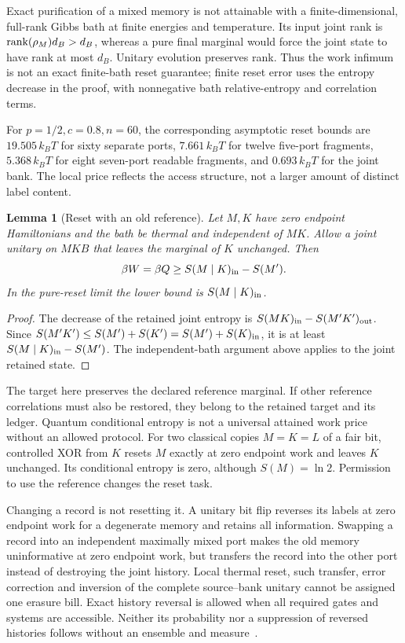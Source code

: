 \documentclass[12pt,a4paper]{article}
\newtheorem{lemma}[theorem]{Lemma}
\begin{document}
Exact purification of a mixed memory is not attainable with a
finite-dimensional, full-rank Gibbs bath at finite energies and temperature.
Its input joint rank is \({\rm rank}(\rho_M)d_B>d_B\), whereas a pure
final marginal would force the joint state to have rank at most \(d_B\).
Unitary evolution preserves rank. Thus the work infimum is not an exact
finite-bath reset guarantee; finite reset error uses the entropy decrease
in the proof, with nonnegative bath relative-entropy and correlation terms.

For \(p=1/2,c=0.8,n=60\), the corresponding asymptotic reset bounds
are \(19.505\,k_BT\) for sixty separate ports, \(7.661\,k_BT\)
for twelve five-port fragments, \(5.368\,k_BT\) for eight seven-port
readable fragments, and \(0.693\,k_BT\) for the joint bank.
The local price reflects the access structure, not a larger amount
of distinct label content.

\begin{lemma}[Reset with an old reference]\label{lem:conditional-reset}
Let \(M,K\) have zero endpoint Hamiltonians and the bath be thermal
and independent of \(MK\). Allow a joint unitary on \(MKB\) that leaves
the marginal of \(K\) unchanged. Then
\[
 \beta W=\beta Q\ge S(M\mid K)_{\rm in}-S(M') .
\]
In the pure-reset limit the lower bound is \(S(M\mid K)_{\rm in}\).
\end{lemma}
\begin{proof}
The decrease of the retained joint entropy is
\(S(MK)_{\rm in}-S(M'K')_{\rm out}\).
Since \(S(M'K')\le S(M')+S(K')=S(M')+S(K)_{\rm in}\),
it is at least \(S(M\mid K)_{\rm in}-S(M')\).
The independent-bath argument above applies to the joint retained state.
\end{proof}

The target here preserves the declared reference marginal. If other
reference correlations must also be restored, they belong to the
retained target and its ledger. Quantum conditional entropy is not a
universal attained work price without an allowed protocol.
For two classical copies \(M=K=L\) of a fair bit, controlled XOR from
\(K\) resets \(M\) exactly at zero endpoint work and leaves \(K\)
unchanged. Its conditional entropy is zero, although \(S(M)=\ln2\).
Permission to use the reference changes the reset task.

Changing a record is not resetting it. A unitary bit flip reverses its
labels at zero endpoint work for a degenerate memory and retains all
information. Swapping a record into an independent maximally mixed port
makes the old memory uninformative at zero endpoint work, but transfers
the record into the other port instead of destroying the joint history.
Local thermal reset, such transfer, error correction and inversion of
the complete source--bank unitary cannot be assigned one erasure bill.
Exact history reversal is allowed when all required gates and systems
are accessible. Neither its probability nor a suppression of reversed
histories follows without an ensemble and measure~\cite{Price2012}.
\end{document}
